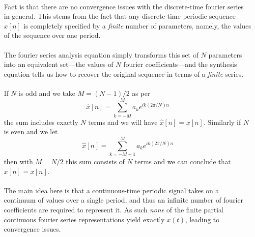 \documentclass{report}
\begin{document}
\vspace{1mm}\\
Fact is that there are no convergence issues with the discrete-time fourier series in general. This stems from the fact that any discrete-time periodic sequence $x[n]$ is completely specified
by a \textit{finite} number of parameters, namely, the values of the sequence over one period.\\
\vspace{1mm}\\
The fourier series analysis equation simply transforms this set of $N$ parameters into an equivalent set---the values of $N$ fourier coefficients---and the synthesis equation tells us how to recover the
original sequence in terms of a \textit{finite} series.\\
\vspace{1mm}\\
If $N$ is odd and we take $M=(N-1)/2$ as per
\begin{equation*}
\hat{x}[n]=\sum^M_{k=-M}a_ke^{ik(2\pi/N)n}
\end{equation*}
the sum includes exactly $N$ terms and we will have $\hat{x}[n]=x[n]$. Similarly if $N$ is even and we let
\begin{equation*}
\hat{x}[n]=\sum^M_{k=-M+1}a_ke^{ik(2\pi/N)n}
\end{equation*}
then with $M=N/2$ this sum consists of $N$ terms and we can conclude that $\hat{x}[n]=x[n]$.\\
\vspace{1mm}\\
The main idea here is that a continuous-time periodic signal takes on a continuum of values over a single period, and thus an infinite number of fourier coefficients are required to represent it. As such
\textit{none} of the finite partial continuous fourier series representations yield exactly $x(t)$, leading to convergence issues.
\newpage
\end{document}
